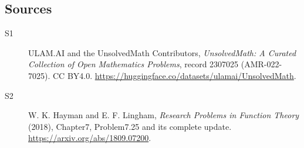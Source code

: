 \documentclass[11pt]{article}
\begin{document}
\subsection{Sources}
\begin{description}
\item[\hypertarget{source:2307025:1}{S1}] ULAM.AI and the UnsolvedMath Contributors, \emph{UnsolvedMath: A Curated Collection of Open Mathematics Problems}, record 2307025 (AMR-022-7025). CC BY4.0. \url{https://huggingface.co/datasets/ulamai/UnsolvedMath}.
\item[\hypertarget{source:2307025:2}{S2}] W. K. Hayman and E. F. Lingham, \emph{Research Problems in Function Theory} (2018), Chapter7, Problem7.25 and its complete update. \url{https://arxiv.org/abs/1809.07200}.
\end{description}
\label{end:2307025}
\end{document}
